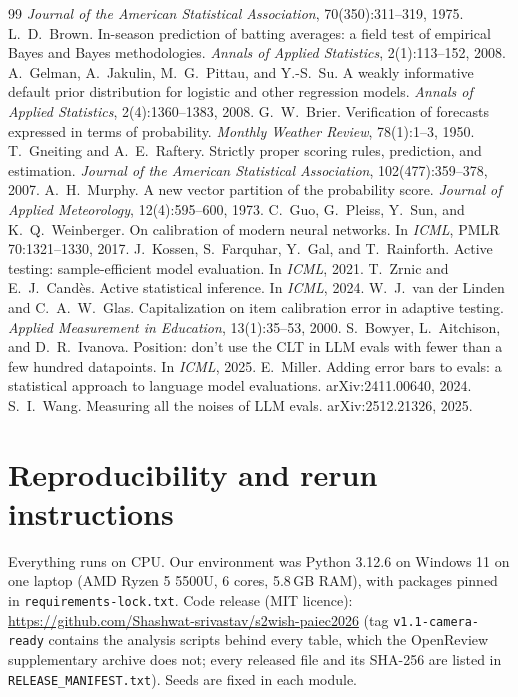 \documentclass{article}
\begin{document}
\begin{thebibliography}{99}
  \emph{Journal of the American Statistical Association}, 70(350):311--319, 1975.
 L.~D.~Brown. In-season prediction of batting averages: a field test of empirical Bayes and Bayes
  methodologies. \emph{Annals of Applied Statistics}, 2(1):113--152, 2008.
 A.~Gelman, A.~Jakulin, M.~G.~Pittau, and Y.-S.~Su. A weakly informative default prior
  distribution for logistic and other regression models. \emph{Annals of Applied Statistics}, 2(4):1360--1383, 2008.
 G.~W.~Brier. Verification of forecasts expressed in terms of probability. \emph{Monthly Weather
  Review}, 78(1):1--3, 1950.
 T.~Gneiting and A.~E.~Raftery. Strictly proper scoring rules, prediction, and estimation.
  \emph{Journal of the American Statistical Association}, 102(477):359--378, 2007.
 A.~H.~Murphy. A new vector partition of the probability score. \emph{Journal of Applied
  Meteorology}, 12(4):595--600, 1973.
 C.~Guo, G.~Pleiss, Y.~Sun, and K.~Q.~Weinberger. On calibration of modern neural networks. In
  \emph{ICML}, PMLR 70:1321--1330, 2017.
 J.~Kossen, S.~Farquhar, Y.~Gal, and T.~Rainforth. Active testing: sample-efficient model
  evaluation. In \emph{ICML}, 2021.
 T.~Zrnic and E.~J.~Cand\`es. Active statistical inference. In \emph{ICML}, 2024.
 W.~J.~van der Linden and C.~A.~W.~Glas. Capitalization on item calibration error in
  adaptive testing. \emph{Applied Measurement in Education}, 13(1):35--53, 2000.
 S.~Bowyer, L.~Aitchison, and D.~R.~Ivanova. Position: don't use the CLT in LLM evals with fewer
  than a few hundred datapoints. In \emph{ICML}, 2025.
 E.~Miller. Adding error bars to evals: a statistical approach to language model evaluations.
  arXiv:2411.00640, 2024.
 S.~I.~Wang. Measuring all the noises of LLM evals. arXiv:2512.21326, 2025.
\end{thebibliography}

\appendix
\section{Reproducibility and rerun instructions}\label{app:rerun}
Everything runs on CPU. Our environment was Python 3.12.6 on Windows 11 on one laptop (AMD Ryzen 5 5500U, 6 cores,
5.8\,GB RAM), with packages pinned in
\texttt{requirements-lock.txt}. Code release (MIT licence): \url{https://github.com/Shashwat-srivastav/s2wish-paiec2026} (tag \texttt{v1.1-camera-ready} contains the analysis scripts behind every table, which the OpenReview supplementary archive does not; every released file and its SHA-256 are listed in \texttt{RELEASE\_MANIFEST.txt}).
Seeds are fixed in each module.
\end{document}
